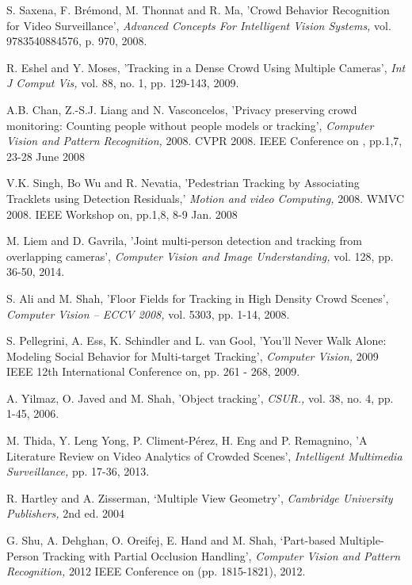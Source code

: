 \documentclass[12pt, onecolumn, conference]{IEEEtran}
\begin{document}
\begin{thebibliography}{1}
S. Saxena, F. Brémond, M. Thonnat and R. Ma, 'Crowd Behavior Recognition for Video Surveillance', \textit{Advanced Concepts For Intelligent Vision Systems,} vol. 9783540884576, p. 970, 2008.

R. Eshel and Y. Moses, 'Tracking in a Dense Crowd Using Multiple Cameras', \textit{Int J Comput Vis,} vol. 88, no. 1, pp. 129-143, 2009.

A.B. Chan, Z.-S.J. Liang and N. Vasconcelos, 'Privacy preserving crowd monitoring: Counting people without people models or tracking', \textit{Computer Vision and Pattern Recognition,} 2008. CVPR 2008. IEEE Conference on , pp.1,7, 23-28 June 2008

V.K. Singh, Bo Wu and R. Nevatia, 'Pedestrian Tracking by Associating Tracklets using Detection Residuals,' \textit{Motion and video Computing,} 2008. WMVC 2008. IEEE Workshop on, pp.1,8, 8-9 Jan. 2008

M. Liem and D. Gavrila, 'Joint multi-person detection and tracking from overlapping cameras', \textit{Computer Vision and Image Understanding,} vol. 128, pp. 36-50, 2014.

S. Ali and M. Shah, 'Floor Fields for Tracking in High Density Crowd Scenes', \textit{Computer Vision – ECCV 2008,} vol. 5303, pp. 1-14, 2008.

S. Pellegrini, A. Ess, K. Schindler and L. van Gool, 'You’ll Never Walk Alone: Modeling Social Behavior for Multi-target Tracking', \textit{Computer Vision,} 2009 IEEE 12th International Conference on, pp. 261 - 268, 2009.

A. Yilmaz, O. Javed and M. Shah, 'Object tracking', \textit{CSUR.,} vol. 38, no. 4, pp. 1-45, 2006.

M. Thida, Y. Leng Yong, P. Climent-Pérez, H. Eng and P. Remagnino, 'A Literature Review on Video Analytics of Crowded Scenes', \textit{Intelligent Multimedia Surveillance,} pp. 17-36, 2013.

R. Hartley and A. Zisserman, ‘Multiple View Geometry’, \textit{Cambridge University Publishers,} 2nd ed. 2004

G. Shu, A. Dehghan, O. Oreifej, E. Hand and M. Shah, ‘Part-based Multiple-Person Tracking with Partial Occlusion Handling’, \textit{Computer Vision and Pattern Recognition,} 2012 IEEE Conference on (pp. 1815-1821), 2012.


\end{thebibliography}
\end{document}
